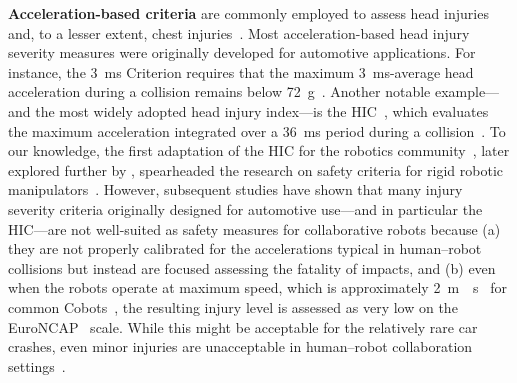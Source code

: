 \textbf{Acceleration-based criteria} are commonly employed to assess head injuries and, to a lesser extent, chest injuries~\citep{haddadin2013towards}. Most acceleration-based head injury severity measures were originally developed for automotive applications. For instance, the \SI{3}{ms} Criterion requires that the maximum \SI{3}{ms}-average head acceleration during a collision remains below \SI{72}{g}~\citep{got1978results, haddadin2013towards}. Another notable example—and the most widely adopted head injury index—is the \gls{HIC}~\citep{versace1971review}, which evaluates the maximum acceleration integrated over a \SI{36}{ms} period during a collision~\citep{haddadin2013towards}. To our knowledge, the first adaptation of the \gls{HIC} for the robotics community~\citep{bicchi2004fast, zinn2004playing, zinn2004new}, later explored further by \citet{haddadin2008role, bicchi2008physical, shin2008hybrid}, spearheaded the research on safety criteria for rigid robotic manipulators~\citep{de2008atlas, haddadin2013towards}. However, subsequent studies have shown that many injury severity criteria originally designed for automotive use—and in particular the \gls{HIC}—are not well-suited as safety measures for collaborative robots because (a) they are not properly calibrated for the accelerations typical in human–robot collisions but instead are focused assessing the fatality of impacts, and (b) even when the robots operate at maximum speed, which is approximately \SI{2}{m \per s}~\citep{haddadin2009requirements} for common \glspl{Cobot}~\citep{albu2007dlr, bischoff2010kuka}, the resulting injury level is assessed as very low on the EuroNCAP~\citep{EuroNCAP2004} scale. While this might be acceptable for the relatively rare car crashes, even minor injuries are unacceptable in human–robot collaboration settings~\citep{haddadin2009requirements, haddadin2011safe}.

